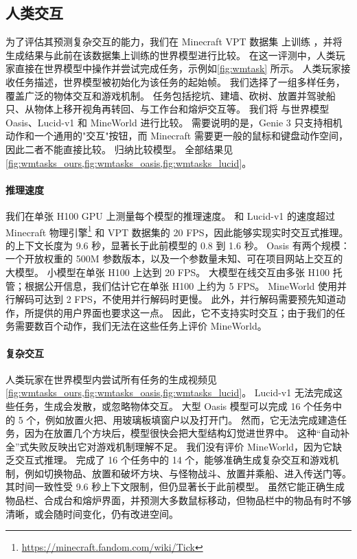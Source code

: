 \documentclass[11pt]{article}
\begin{document}
\subsection{人类交互}
\label{sec:interact}

为了评估其预测复杂交互的能力，我们在 Minecraft VPT 数据集\citep{vpt} 上训练 \method，并将生成结果与此前在该数据集上训练的世界模型进行比较。
在这一评测中，人类玩家直接在世界模型中操作并尝试完成任务，示例如\cref{fig:wmtask} 所示。
人类玩家接收任务描述，世界模型被初始化为该任务的起始帧。
我们选择了一组多样任务，覆盖广泛的物体交互和游戏机制。
任务包括挖坑、建墙、砍树、放置并驾驶船只、从物体上移开视角再转回、与工作台和熔炉交互等。
我们将 \method 与世界模型 Oasis\citep{oasis}、Lucid-v1\citep{lucidv1} 和 MineWorld\citep{mineworld} 进行比较。
需要说明的是，Genie 3 \citep{genie3} 只支持相机动作和一个通用的"交互"按钮，而 Minecraft 需要更一般的鼠标和键盘动作空间，因此二者不能直接比较。
 归纳比较模型。
全部结果见\cref{fig:wmtasks_ours,fig:wmtasks_oasis,fig:wmtasks_lucid}。



\pagebreak
\paragraph{推理速度}

我们在单张 H100 GPU 上测量每个模型的推理速度。
\method 和 Lucid-v1 的速度超过 Minecraft 物理引擎\footnote{\url{https://minecraft.fandom.com/wiki/Tick}} 和 VPT 数据集\citep{vpt}的 20 FPS，因此能够实现实时交互式推理。
\method 的上下文长度为 9.6 秒，显著长于此前模型的 0.8 到 1.6 秒。
Oasis 有两个规模：一个开放权重的 500M 参数版本，以及一个参数量未知、可在项目网站上交互的大模型。
小模型在单张 H100 上达到 20 FPS。
大模型在线交互由多张 H100 托管；根据公开信息，我们估计它在单张 H100 上约为 5 FPS。
MineWorld 使用并行解码可达到 2 FPS，不使用并行解码时更慢。
此外，并行解码需要预先知道动作，所提供的用户界面也要求这一点。
因此，它不支持实时交互；由于我们的任务需要数百个动作，我们无法在这些任务上评价 MineWorld。



\enlargethispage{2\baselineskip}
\paragraph{复杂交互}

人类玩家在世界模型内尝试所有任务的生成视频见\cref{fig:wmtasks_ours,fig:wmtasks_oasis,fig:wmtasks_lucid}。
Lucid-v1 无法完成这些任务，生成会发散，或忽略物体交互。
大型 Oasis 模型可以完成 16 个任务中的 5 个，例如放置火把、用玻璃板填窗户以及打开门。
然而，它无法完成建造任务，因为在放置几个方块后，模型很快会把大型结构幻觉进世界中。
这种“自动补全”式失败反映出它对游戏机制理解不足。
我们没有评价 MineWorld，因为它缺乏交互式推理。
\method 完成了 16 个任务中的 14 个，能够准确生成复杂交互和游戏机制，例如切换物品、放置和破坏方块、与怪物战斗、放置并乘船、进入传送门等。
其时间一致性受 9.6 秒上下文限制，但仍显著长于此前模型。
虽然它能正确生成物品栏、合成台和熔炉界面，并预测大多数鼠标移动，但物品栏中的物品有时不够清晰，或会随时间变化，仍有改进空间。
\end{document}
